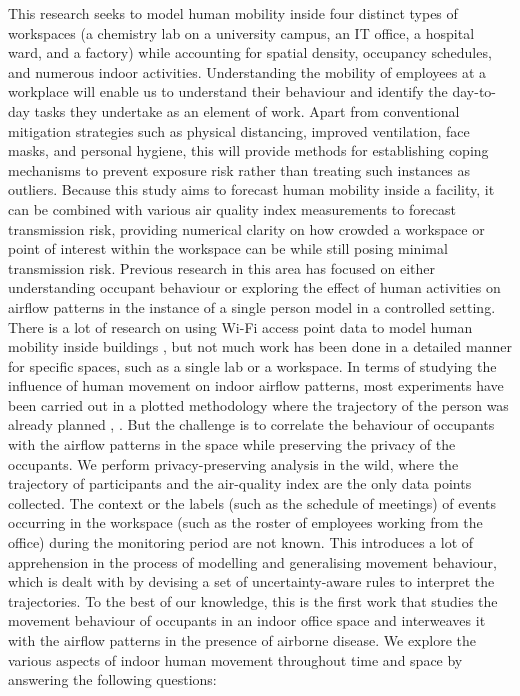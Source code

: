 \documentclass[acmtog]{acmart}
\begin{document}
This research seeks to model human mobility inside four distinct types of workspaces (a chemistry lab on a university campus, an IT office, a hospital ward, and a factory) while accounting for spatial density, occupancy schedules, and numerous indoor activities. Understanding the mobility of employees at a workplace will enable us to understand their behaviour and identify the day-to-day tasks they undertake as an element of work. Apart from conventional mitigation strategies such as physical distancing, improved ventilation, face masks, and personal hygiene, this will provide methods for establishing coping mechanisms to prevent exposure risk rather than treating such instances as outliers. Because this study aims to forecast human mobility inside a facility, it can be combined with various air quality index measurements to forecast transmission risk, providing numerical clarity on how crowded a workspace or point of interest within the workspace can be while still posing minimal transmission risk. Previous research in this area has focused on either understanding occupant behaviour or exploring the effect of human activities on airflow patterns in the instance of a single person model in a controlled setting. There is a lot of research on using Wi-Fi access point data to model human mobility inside buildings \cite{qian2016decimeter}, \cite{meneses2012large} but not much work has been done in a detailed manner for specific spaces, such as a single lab or a workspace. In terms of studying the influence of human movement on indoor airflow patterns, most experiments have been carried out in a plotted methodology where the trajectory of the person was already planned \cite{mahaki2021comparing}, \cite{wu2022transient}. But the challenge is to correlate the behaviour of occupants with the airflow patterns in the space while preserving the privacy of the occupants. We perform privacy-preserving analysis in the wild, where the trajectory of participants and the air-quality index are the only data points collected. The context or the labels (such as the schedule of meetings) of events occurring in the workspace (such as the roster of employees working from the office) during the monitoring period are not known. This introduces a lot of apprehension in the process of modelling and generalising movement behaviour, which is dealt with by devising a set of uncertainty-aware rules to interpret the trajectories. To the best of our knowledge, this is the first work that studies the movement behaviour of occupants in an indoor office space and interweaves it with the airflow patterns in the presence of airborne disease. We explore the various aspects of indoor human movement throughout time and space by answering the following questions:
\end{document}
